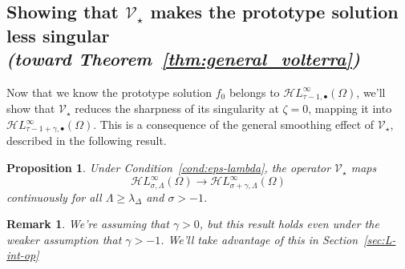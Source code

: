\documentclass{article}
\theoremstyle{plain}
\newtheorem{prop}{Proposition}
\newtheorem{rmk}{Remark}
\newcommand{\singexp}[2]{\mathcal{H}L^\infty_{#1, #2}}
\newcommand{\singexpalg}[1]{\singexp{#1}{\bullet}}
\newcommand{\softpart}{\mathcal{V}_\star}
\newcommand{\solproto}{f_0}
\newcommand{\domain}{\Omega}
\begin{document}
\subsection{Showing that $\softpart$ makes the prototype solution less singular \\ \textit{(toward Theorem~\ref{thm:general_volterra})}}\label{sec:image under soft_part}
Now that we know the prototype solution $\solproto$ belongs to $\singexpalg{\tau-1}(\domain)$, we'll show that $\softpart$ reduces the sharpness of its singularity at $\zeta = 0$, mapping it into $\singexpalg{\tau-1+\gamma}(\domain)$. This is a consequence of the general smoothing effect of $\softpart$, described in the following result.

\begin{prop}\label{prop:smoothing}
Under {\em Condition~\eqref{cond:eps-lambda}}, the operator $\softpart$ maps
\[ \singexp{\sigma}{\Lambda}(\Omega) \to \singexp{\sigma+\gamma}{\Lambda}(\Omega) \]
continuously for all $\Lambda\geq \lambda_{\Delta}$ and $\sigma>-1$.
\end{prop}
\begin{rmk}
We're assuming that $\gamma > 0$, but this result holds even under the weaker assumption that $\gamma > -1$. We'll take advantage of this in Section~\ref{sec:L-int-op}
\end{rmk}
\end{document}
